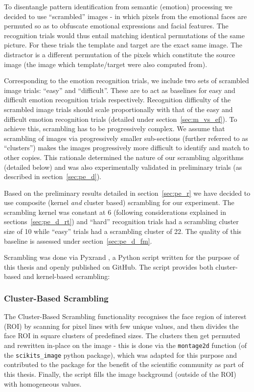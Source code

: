 	    To disentangle pattern identification from semantic (emotion) processing we decided to use “scrambled” images - in which pixels from the emotional faces are permuted so as to obfuscate emotional expressions and facial features.
	    The recognition trials would thus entail matching identical permutations of the same picture.
	    For these trials the template and target are the exact same image.
	    The distractor is a different permutation of the pixels which constitute the source image (the image which template/target were also computed from). 
	    
	    Corresponding to the emotion recognition trials, we include two sets of scrambled image trials: “easy” and “difficult”.
	    These are to act as baselines for easy and difficult emotion recognition trials respectively.
	    Recognition difficulty of the scrambled image trials should scale proportionally with that of the easy and difficult emotion recognition trials (detailed under section~\ref{sec:m_vs_ef}).
	    To achieve this, scrambling has to be progressively complex.
	    We assume that scrambling of images via progressively smaller sub-sections (further referred to as “clusters”) makes the images progressively more difficult to identify and match to other copies.
	    This rationale determined the nature of our scrambling algorithms (detailed below) and was also experimentally validated in preliminary trials (as described in section~\ref{sec:pe_d}).
	    
	    Based on the preliminary results detailed in section~\ref{sec:pe_r} we have decided to use composite (kernel \textit{and} cluster based) scrambling for our experiment.
	    The scrambling kernel was constant at \SI{6}{\pixel} (following considerations explained in sections~\ref{sec:pe_d_rt}) 
	    and “hard” recognition trials had a scrambling cluster size of \SI{10}{\pixel} while “easy” trials had a scrambling cluster of \SI{22}{\pixel}.
	    The quality of this baseline is assessed under section~\ref{sec:pe_d_fm}.
	    
	    Scrambling was done via Pyxrand \citep{pyxrand}, a Python script written for the purpose of this thesis and openly published on GitHub.
	    The script provides both cluster-based and kernel-based scrambling:
	    \subsubsection{Cluster-Based Scrambling}
		The Cluster-Based Scrambling functionality recognises the face region of interest (ROI) by scanning for pixel lines with few unique values, and then divides the face ROI in square clusters of predefined sizes.
		The clusters then get permuted and rewritten in-place on the image - this is done via the \colorbox{vlg}{\texttt{montage2d}} function (of the \colorbox{vlg}{\texttt{scikits\_image}} python package), which  was adapted for this purpose and contributed to the package for the benefit of the scientific community as part of this thesis.
		Finally, the script fills the image background (outside of the ROI) with homogeneous values.

